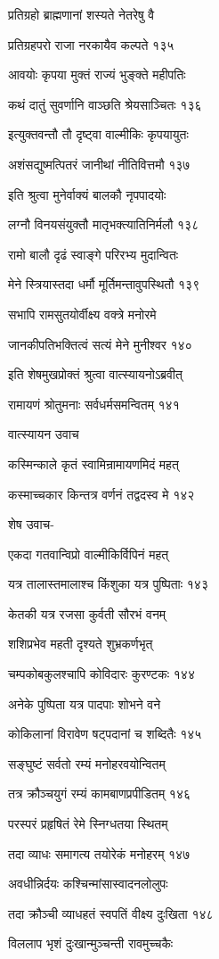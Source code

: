 प्रतिग्रहो ब्राह्मणानां शस्यते नेतरेषु वै

प्रतिग्रहपरो राजा नरकायैव कल्पते १३५

आवयोः कृपया मुक्तं राज्यं भुङ्क्ते महीपतिः

कथं दातुं सुवर्णानि वाञ्छति श्रेयसाञ्चितः १३६

इत्युक्तवन्तौ तौ दृष्ट्वा वाल्मीकिः कृपयायुतः

अशंसद्युष्मत्पितरं जानीथां नीतिवित्तमौ १३७

इति श्रुत्वा मुनेर्वाक्यं बालकौ नृपपादयोः

लग्नौ विनयसंयुक्तौ मातृभक्त्यातिनिर्मलौ १३८

रामो बालौ दृढं स्वाङ्गे परिरभ्य मुदान्वितः

मेने स्त्रियास्तदा धर्मौ मूर्तिमन्तावुपस्थितौ १३९

सभापि रामसुतयोर्वीक्ष्य वक्त्रे मनोरमे

जानकीपतिभक्तित्वं सत्यं मेने मुनीश्वर १४०

इति शेषमुखप्रोक्तं श्रुत्वा वात्स्यायनोऽब्रवीत्

रामायणं श्रोतुमनाः सर्वधर्मसमन्वितम् १४१

वात्स्यायन उवाच

कस्मिन्काले कृतं स्वामिन्रामायणमिदं महत्

कस्माच्चकार किन्तत्र वर्णनं तद्वदस्व मे १४२

शेष उवाच-

एकदा गतवान्विप्रो वाल्मीकिर्विपिनं महत्

यत्र तालास्तमालाश्च किंशुका यत्र पुष्पिताः १४३

केतकी यत्र रजसा कुर्वती सौरभं वनम्

शशिप्रभेव महती दृश्यते शुभ्रकर्णभृत्

चम्पकोबकुलश्चापि कोविदारः कुरण्टकः १४४

अनेके पुष्पिता यत्र पादपाः शोभने वने

कोकिलानां विरावेण षट्पदानां च शब्दितैः १४५

सङ्घुष्टं सर्वतो रम्यं मनोहरवयोन्वितम्

तत्र क्रौञ्चयुगं रम्यं कामबाणप्रपीडितम् १४६

परस्परं प्रहृषितं रेमे स्निग्धतया स्थितम्

तदा व्याधः समागत्य तयोरेकं मनोहरम् १४७

अवधीन्निर्दयः कश्चिन्मांसास्वादनलोलुपः

तदा क्रौञ्ची व्याधहतं स्वपतिं वीक्ष्य दुःखिता १४८

विललाप भृशं दुःखान्मुञ्चन्ती रावमुच्चकैः

